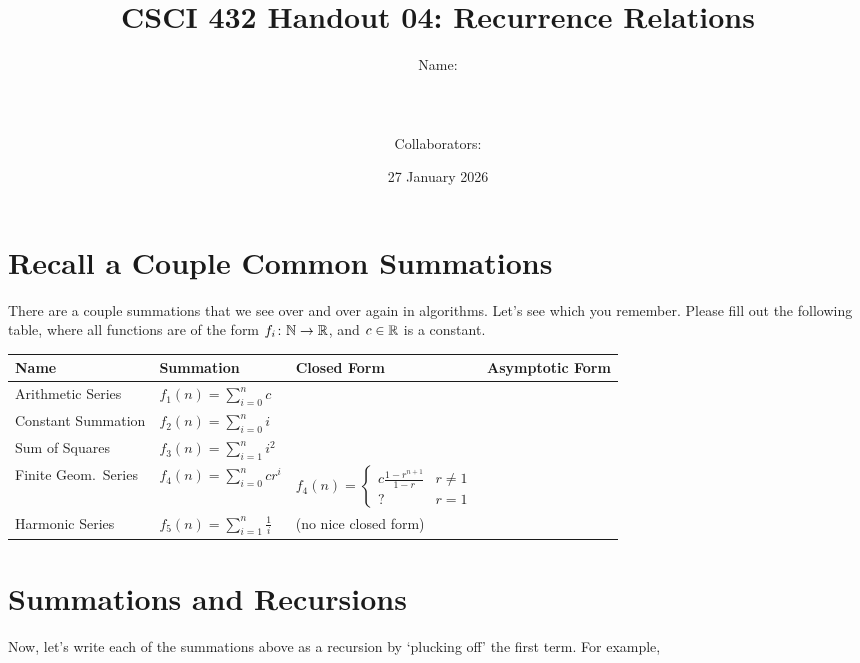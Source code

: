 \documentclass{article}
\title{CSCI 432 Handout 04: Recurrence Relations}
\author{Name: \rule{3in}{0.15mm} \\~\\
    Collaborators: \rule{3in}{0.15mm} }
\date{27 January 2026}
\begin{document}
\maketitle

\section*{Recall a Couple Common Summations}

There are a couple summations that we see over and over again in algorithms.
Let's see which you remember.  Please fill out the following table, where all
functions are of the form $f_i \colon {\mathbb N} \to {\mathbb R}$, and $c \in {\mathbb R}$ is a constant.

\begin{table}[h!]
    \begin{tabular}{p{0.75in} p{1.25in} p{2in} p{2in}}
        \toprule
        Name & Summation    & Closed Form & Asymptotic Form \\
        \midrule
        Arithmetic Series   & $f_1(n) = \sum_{i=0}^n c$ \vspace{.9in} & & \\
        Constant Summation  & $f_2(n) = \sum_{i=0}^n i$ \vspace{.9in} & & \\
        Sum of Squares  & $f_3(n) = \sum_{i=1}^n i^2$ \vspace{.9in} & & \\
        Finite Geom.\ Series & $f_4(n) = \sum_{i=0}^n c r^i$ \vspace{.9in} &
            $f_4(n) = \begin{cases}
                c\frac{1-r^{n+1}}{1-r} & r \neq 1 \\
                ? & r = 1
                    \end{cases}$                         & \\
        Harmonic Series  & $f_5(n) = \sum_{i=1}^n \frac{1}{i}$ \vspace{.9in} &
            (no nice closed form) & \\
        \bottomrule
    \end{tabular}
\end{table}

\FloatBarrier
\section*{Summations and Recursions}

Now, let's write each of the summations above as a recursion by `plucking off'
the first term.  For example,
\end{document}
